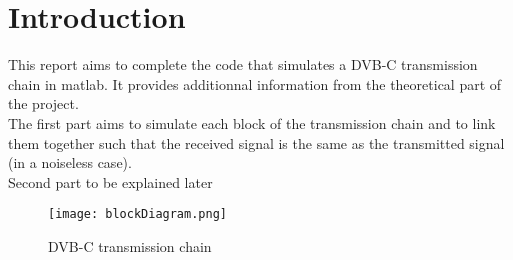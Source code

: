 \setcounter{secnumdepth}{-1}

\chapter{Introduction}

This report aims to complete the code that simulates a DVB-C transmission chain in matlab. It provides additionnal information from the theoretical part of the project. \\
The first part aims to simulate each block of the transmission chain and to link them together such that the received signal is the same as the transmitted signal (in a noiseless case). \\

\Large{Second part to be explained later}
\normalsize

\vspace{2cm}

\begin{figure}[H]
    \centering
    \texttt{[image: blockDiagram.png]}
    \caption{DVB-C transmission chain}
    \label{fig:blockDiagram}
\end{figure}
